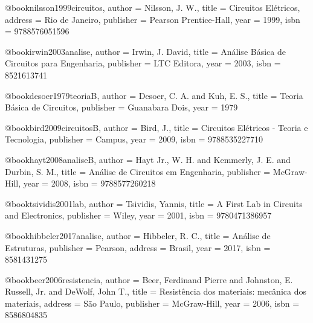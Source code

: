 @book{nilsson1999circuitos,
  author = {Nilsson, J. W.},
  title = {Circuitos Elétricos},
  address = {Rio de Janeiro},
  publisher = {Pearson Prentice-Hall},
  year = {1999},
  isbn = {9788576051596}
}

@book{irwin2003analise,
  author = {Irwin, J. David},
  title = {Análise Básica de Circuitos para Engenharia},
  publisher = {LTC Editora},
  year = {2003},
  isbn = {8521613741}
}

@book{desoer1979teoriaB,
  author = {Desoer, C. A. and Kuh, E. S.},
  title = {Teoria Básica de Circuitos},
  publisher = {Guanabara Dois},
  year = {1979}
}

@book{bird2009circuitosB,
  author = {Bird, J.},
  title = {Circuitos Elétricos - Teoria e Tecnologia},
  publisher = {Campus},
  year = {2009},
  isbn = {9788535227710}
}

@book{hayt2008analiseB,
  author = {Hayt Jr., W. H. and Kemmerly, J. E. and Durbin, S. M.},
  title = {Análise de Circuitos em Engenharia},
  publisher = {McGraw-Hill},
  year = {2008},
  isbn = {9788577260218}
}

@book{tsividis2001lab,
  author = {Tsividis, Yannis},
  title = {A First Lab in Circuits and Electronics},
  publisher = {Wiley},
  year = {2001},
  isbn = {9780471386957}
}

%

@book{hibbeler2017analise,
  author = {Hibbeler, R. C.},
  title = {Análise de Estruturas},
  publisher = {Pearson},
  address = {Brasil},
  year = {2017},
  isbn = {8581431275}
}

@book{beer2006resistencia,
  author = {Beer, Ferdinand Pierre and Johnston, E. Russell, Jr. and DeWolf, John T.},
  title = {Resistência dos materiais: mecânica dos materiais},
  address = {São Paulo},
  publisher = {McGraw-Hill},
  year = {2006},
  isbn = {8586804835}
}

